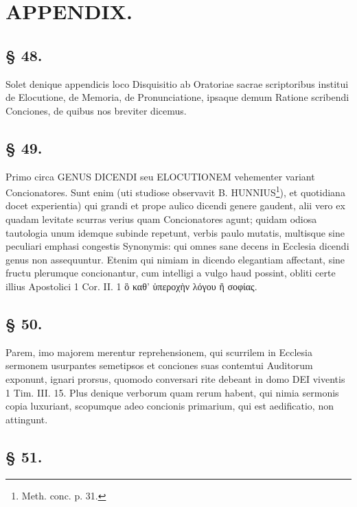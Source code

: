 \section*{APPENDIX.}

\subsection*{§ 48.}

Solet denique appendicis loco Disquisitio ab Oratoriae sacrae scriptoribus institui de Elocutione, de
Memoria, de Pronunciatione, ipsaque demum Ratione scribendi Conciones, de quibus nos breviter dicemus.

\subsection*{§ 49.}

Primo circa GENUS DICENDI seu ELOCUTIONEM vehementer variant Concionatores. Sunt enim (uti studiose observavit B. HUNNIUS\footnote{Meth. conc. p. 31.}), et quotidiana docet experientia) qui grandi et prope aulico dicendi genere gaudent, alii vero ex quadam levitate scurras verius quam Concionatores agunt; quidam odiosa tautologia unum idemque subinde repetunt, verbis paulo mutatis, multisque sine peculiari emphasi congestis Synonymis: qui omnes sane decens in Ecclesia dicendi genus non assequuntur. Etenim qui nimiam in dicendo elegantiam affectant, sine fructu plerumque concionantur, cum intelligi a vulgo haud possint, obliti certe illius Apostolici 1 Cor. II. 1 ὃ καθ’ ὑπεροχὴν λόγου ἢ σοφίας.

\subsection*{§ 50.}

Parem, imo majorem merentur reprehensionem, qui scurrilem in Ecclesia sermonem usurpantes semetipsos et conciones suas contemtui Auditorum exponunt, ignari prorsus, quomodo conversari rite debeant in domo DEI viventis 1 Tim. III. 15. Plus denique verborum quam rerum habent, qui nimia sermonis copia luxuriant, scopumque adeo concionis primarium, qui est aedificatio, non attingunt.

\subsection*{§ 51.}

